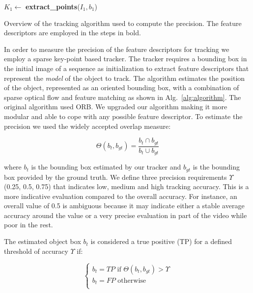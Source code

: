 \begin{algorithm}[h]
 $K_{1} \gets$ \textbf{extract\_points}($I_{1},b_1$)\;
 \caption{\label{alg:algorithm}Overview of the tracking algorithm used to compute the precision. The feature descriptors are employed in the steps in bold. }
\end{algorithm}

In order to measure the precision of the feature descriptors for tracking we employ a sparse key-point based tracker. The tracker requires a bounding box in the initial image of a sequence as initialization to extract feature descriptors that represent the \textit{model} of the object to track. The algorithm estimates the position of the object, represented as an oriented bounding box, with a combination of sparse optical flow and feature matching as shown in Alg.~\ref{alg:algorithm}. The original algorithm used ORB. We upgraded our algorithm making it more modular and able to cope with any possible feature descriptor. To estimate the precision we used the widely accepted overlap measure:

\begin{equation}
	\Theta (b_{t}, b_{gt}) = \frac{b_{t} \cap b_{gt}}{b_{t} \cup b_{gt}}
\end{equation}

where \textit{$b_{t}$} is the bounding box estimated by our tracker and
\textit{$b_{gt}$} is the bounding box provided by the ground truth. We define 
three precision requirements $\Upsilon$ (0.25, 0.5, 0.75) that indicates low, medium and high tracking accuracy. This is a more indicative evaluation compared to the overall accuracy. For instance, an overall value of 0.5 is ambiguous because it may indicate either a stable average accuracy around the value or a very precise evaluation in part of the video while poor in the rest.

The estimated object box \textit{$b_{t}$} is considered a true positive (TP) for a defined threshold of
accuracy $\Upsilon$ if:

\begin{equation}
\begin{cases}
b_{t} = TP  \text{ if } \Theta(b_{t}, b_{gt}) > \Upsilon \\
b_{t} = FP  \text{ otherwise }\\
\end{cases}
\end{equation}

